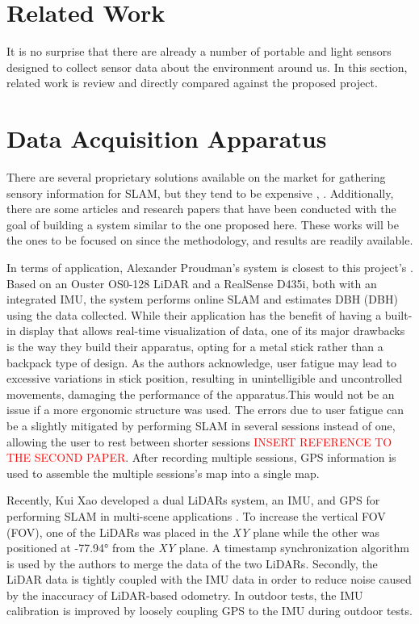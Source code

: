 \section{Related Work}

It is no surprise that there are already a number of portable and light sensors designed to collect sensor data about the environment around us. In this section, related work is review and directly compared against the proposed project.

\section{Data Acquisition Apparatus}

There are several proprietary solutions available on the market for gathering sensory information for \acs*{SLAM}, but they tend to be expensive \cite{libackpack_C50}, \cite{libackpack_DGC50}. Additionally, there are some articles and research papers that have been conducted with the goal of building a system similar to the one proposed here. These works will be the ones to be focused on since the methodology, and results are readily available.

In terms of application, Alexander Proudman's system is closest to this project's \cite{proudman_online_2021}. Based on an Ouster OS0-128 \acs{LiDAR} and a RealSense D435i, both with an integrated \acs{IMU}, the system performs online \acs{SLAM} and estimates \acl{DBH} (\acs*{DBH}) using the data collected. While their application has the benefit of having a built-in display that allows real-time visualization of data, one of its major drawbacks is the way they build their apparatus, opting for a metal stick rather than a backpack type of design. As the authors acknowledge, user fatigue may lead to excessive variations in stick position, resulting in unintelligible and uncontrolled movements, damaging the performance of the apparatus.This would not be an issue if a more ergonomic structure was used. The errors due to user fatigue can be a slightly mitigated by performing \acs{SLAM} in several sessions instead of one, allowing the user to rest between shorter sessions \textcolor{red}{INSERT REFERENCE TO THE SECOND PAPER}. After recording multiple sessions, \acs*{GPS} information is used to assemble the multiple sessions's map into a single map.

Recently, Kui Xao developed a dual \acs*{LiDAR}s system, an \acs*{IMU}, and \acs*{GPS} for performing \acs*{SLAM} in multi-scene applications \cite{xiao_high-precision_2022}. To increase the vertical \acl*{FOV} (\acs*{FOV}), one of the \acs*{LiDAR}s was placed in the \textit{XY} plane while the other was positioned at -77.94° from the \textit{XY} plane. A timestamp synchronization algorithm is used by the authors to merge the data of the two \acs*{LiDAR}s. Secondly, the \acs*{LiDAR} data is tightly coupled with the IMU data in order to reduce noise caused by the inaccuracy of \acs*{LiDAR}-based odometry. In outdoor tests, the \acs*{IMU} calibration is improved by loosely coupling \acs*{GPS} to the \acs*{IMU} during outdoor tests.